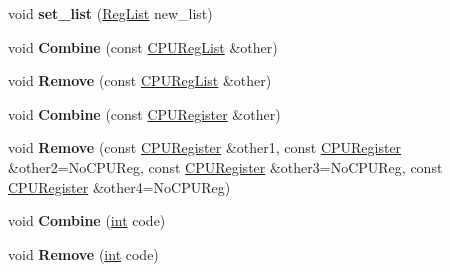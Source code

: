 \begin{DoxyCompactItemize}
\mbox{\label{classv8_1_1internal_1_1CPURegList_ae2b98041d850628fadec5189229dc7d0}} 
void {\bfseries set\+\_\+list} (\mbox{\hyperlink{classuint32__t}{Reg\+List}} new\+\_\+list)
\item 
\mbox{\label{classv8_1_1internal_1_1CPURegList_ab6666cd64473fcf6b9bf157c52c4afe9}} 
void {\bfseries Combine} (const \mbox{\hyperlink{classv8_1_1internal_1_1CPURegList}{C\+P\+U\+Reg\+List}} \&other)
\item 
\mbox{\label{classv8_1_1internal_1_1CPURegList_a093ef3110e5fcf14f834eb210b2c5a65}} 
void {\bfseries Remove} (const \mbox{\hyperlink{classv8_1_1internal_1_1CPURegList}{C\+P\+U\+Reg\+List}} \&other)
\item 
\mbox{\label{classv8_1_1internal_1_1CPURegList_a463ddb8efa62362190f8ec187cb9bf44}} 
void {\bfseries Combine} (const \mbox{\hyperlink{classv8_1_1internal_1_1CPURegister}{C\+P\+U\+Register}} \&other)
\item 
\mbox{\label{classv8_1_1internal_1_1CPURegList_adfa7d665009cdd077ca4001c1fa2a451}} 
void {\bfseries Remove} (const \mbox{\hyperlink{classv8_1_1internal_1_1CPURegister}{C\+P\+U\+Register}} \&other1, const \mbox{\hyperlink{classv8_1_1internal_1_1CPURegister}{C\+P\+U\+Register}} \&other2=No\+C\+P\+U\+Reg, const \mbox{\hyperlink{classv8_1_1internal_1_1CPURegister}{C\+P\+U\+Register}} \&other3=No\+C\+P\+U\+Reg, const \mbox{\hyperlink{classv8_1_1internal_1_1CPURegister}{C\+P\+U\+Register}} \&other4=No\+C\+P\+U\+Reg)
\item 
\mbox{\label{classv8_1_1internal_1_1CPURegList_a583e6f37f6ca75ea794e28fc61d44ef8}} 
void {\bfseries Combine} (\mbox{\hyperlink{classint}{int}} code)
\item 
\mbox{\label{classv8_1_1internal_1_1CPURegList_a793409f12364f86f730fdcfd7f06a13e}} 
void {\bfseries Remove} (\mbox{\hyperlink{classint}{int}} code)
\item 
\mbox{\label{classv8_1_1internal_1_1CPURegList_a2678bdb9c6393a3082b004124ca7b650}} 

\end{DoxyCompactItemize}
